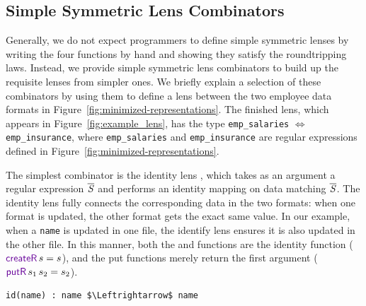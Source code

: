 \documentclass[acmsmall,screen,anonymous]{acmart}
\begin{document}
\subsection{Simple Symmetric Lens Combinators} 
Generally, we do not expect programmers to define simple symmetric lenses by
writing the four functions by hand and showing they satisfy the
roundtripping laws.  Instead, we provide simple symmetric lens
combinators to build up the requisite lenses from simpler ones.
We briefly explain a selection of these combinators by using them to
define a lens between 
the two employee data formats in Figure~\ref{fig:minimized-representations}. 
The finished lens, which appears in Figure~\ref{fig:example_lens}, has
the type 
\lstinline{emp_salaries} $\Leftrightarrow$ \lstinline{emp_insurance}, where
\lstinline{emp_salaries} and \lstinline{emp_insurance} are regular
expressions defined in Figure~\ref{fig:minimized-representations}. 


The simplest combinator is the identity lens \IdentityLens, which takes as an
argument a regular expression $\overline{\mathit{S}}$ and performs an identity mapping on data
matching $\overline{\mathit{S}}$. The identity lens fully connects the
corresponding data in the two formats: when one format is
updated, the other format gets the exact same value. In our example,
when a \lstinline{name} is updated in one file, the identify lens ensures it is
also updated in the other file. In this manner, both the \CreateR and \CreateL
functions are the identity function ($\CreateR \App s = s$), and the put
functions merely return the first argument ($\PutROf{s_1}{s_2} = s_2$).

%
\begin{lstlisting}
id(name) : name $\Leftrightarrow$ name
\end{lstlisting}
%
\end{document}
